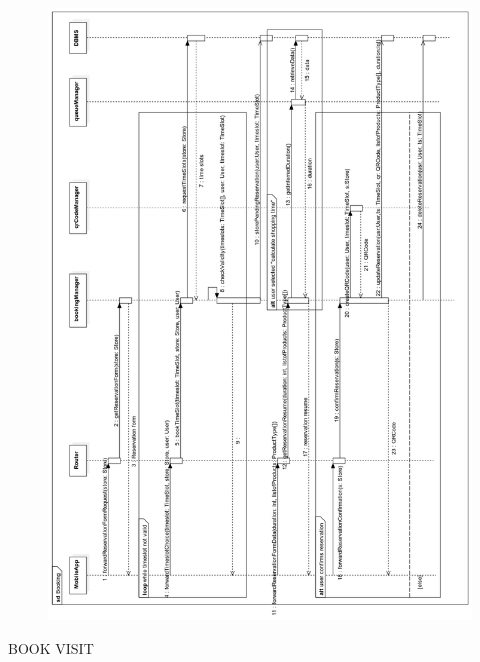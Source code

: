 \documentclass{article}
\begin{document}
\begin{figure}[H]
  \includegraphics[width=\linewidth]{BookingRT.png}
  
\end{figure}
\newpage
BOOK VISIT\\
\end{document}
